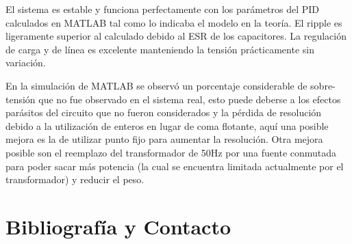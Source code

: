 \documentclass[12pt]{report}
\begin{document}
El sistema es estable y funciona perfectamente con los parámetros del PID calculados en MATLAB tal como lo indicaba el modelo en la teoría. El ripple es ligeramente superior al calculado debido al ESR de los capacitores. La regulación de carga y de línea es excelente manteniendo la tensión prácticamente sin variación. 

En la simulación de MATLAB se observó un porcentaje considerable de sobre-tensión que no fue observado en el sistema real, esto puede deberse a los efectos parásitos del circuito que no fueron considerados y la pérdida de resolución debido a la utilización de enteros en lugar de coma flotante, aquí una posible mejora es la de utilizar punto fijo para aumentar la resolución. Otra mejora posible son el reemplazo del transformador de 50Hz por una fuente conmutada para poder sacar más potencia (la cual se encuentra limitada actualmente por el transformador) y reducir el peso.

\newpage
\chapter{Bibliografía y Contacto}
\end{document}
